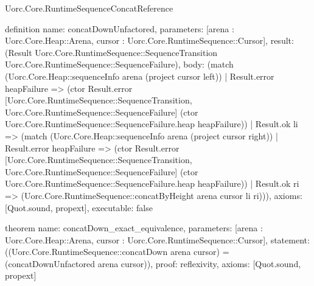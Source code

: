 \begin{lexlean}{Uorc.Core.RuntimeSequenceConcatReference}
\begin{semanticmodule}
definition{
  name: concatDownUnfactored,
  parameters: [arena : Uorc.Core.Heap::Arena, cursor : Uorc.Core.RuntimeSequence::Cursor],
  result: (Result Uorc.Core.RuntimeSequence::SequenceTransition Uorc.Core.RuntimeSequence::SequenceFailure),
  body: (match (Uorc.Core.Heap::sequenceInfo arena (project cursor left))
    | Result.error heapFailure => (ctor Result.error [Uorc.Core.RuntimeSequence::SequenceTransition, Uorc.Core.RuntimeSequence::SequenceFailure] (ctor Uorc.Core.RuntimeSequence::SequenceFailure.heap heapFailure))
    | Result.ok li => (match (Uorc.Core.Heap::sequenceInfo arena (project cursor right))
      | Result.error heapFailure => (ctor Result.error [Uorc.Core.RuntimeSequence::SequenceTransition, Uorc.Core.RuntimeSequence::SequenceFailure] (ctor Uorc.Core.RuntimeSequence::SequenceFailure.heap heapFailure))
      | Result.ok ri => (Uorc.Core.RuntimeSequence::concatByHeight arena cursor li ri))),
  axioms: [Quot.sound, propext],
  executable: false
}

theorem{
  name: concatDown_exact_equivalence,
  parameters: [arena : Uorc.Core.Heap::Arena, cursor : Uorc.Core.RuntimeSequence::Cursor],
  statement: ((Uorc.Core.RuntimeSequence::concatDown arena cursor) = (concatDownUnfactored arena cursor)),
  proof: reflexivity{},
  axioms: [Quot.sound, propext]
}


\end{semanticmodule}
\end{lexlean}
